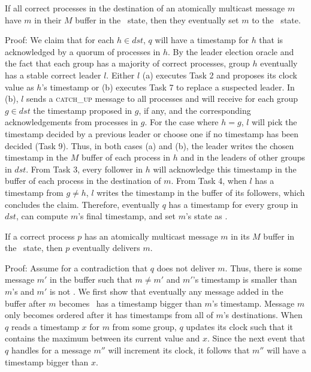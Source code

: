 \begin{lemma}
If all correct processes in the destination of an atomically multicast message $m$ have $m$ in their $M$ buffer in the \mcast\ state, then they eventually set $m$ to the \ordered\ state.
\label{lemma:X}
\end{lemma}
\noindent
{\sc Proof:} 
We claim that for each $h \in dst$, $q$ will have a timestamp for $h$ that is acknowledged by a quorum of processes in $h$.
By the leader election oracle and the fact that each group has a majority of correct processes, group $h$ eventually has a stable correct leader $l$.
Either $l$ (a) executes Task 2 and proposes its clock value as $h$'s timestamp or (b) executes Task 7 to replace a suspected leader.
In (b), $l$ sends a \textsc{catch\_up} message to all processes and will receive for each group $g \in dst$ the timestamp proposed in $g$, if any, and the corresponding acknowledgements from processes in $g$.
For the case where $h=g$, $l$ will pick the timestamp decided by a previous leader or choose one if no timestamp has been decided (Task 9).
Thus, in both cases (a) and (b), the leader writes the chosen timestamp in the $M$ buffer of each process in $h$ and in the leaders of other groups in $dst$.
From Task 3, every follower in $h$ will acknowledge this timestamp in the buffer of each process in the destination of $m$.
From Task 4, when $l$ has a timestamp from $g \neq h$, $l$ writes the timestamp in the buffer of its followers, which concludes the claim.
Therefore, eventually $q$ has a timestamp for every group in $dst$, can compute $m$'s final timestamp, and set $m$'s state as \ordered.

\begin{lemma}
If a correct process $p$ has an atomically multicast message $m$ in its $M$ buffer in the \ordered\ state, then $p$ eventually delivers $m$.
\label{lemma:Z}
\end{lemma}
\noindent
{\sc Proof:} 
Assume for a contradiction that $q$ does not deliver $m$.
Thus, there is some message $m'$ in the buffer such that $m \neq m'$ and $m'$'s timestamp is smaller than $m$'s and $m'$ is not \ordered.
We first show that eventually any message added in the buffer after $m$ becomes \ordered\ has a timestamp bigger than $m$'s timestamp.
Message $m$ only becomes ordered after it has timestamps from all of $m$'s destinations.
When $q$ reads a timestamp $x$ for $m$ from some group, $q$ updates its clock such that it contains the maximum between its current value and $x$.
Since the next event that $q$ handles for a message $m''$ will increment its clock, it follows that $m''$ will have a timestamp bigger than $x$.

